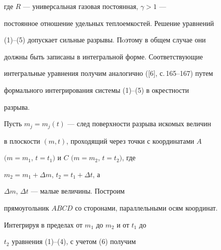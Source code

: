 где $R$ --- универсальная газовая постоянная, $ \gamma > 1 $ ---


постоянное отношение удельных теплоемкостей. Решение уравнений


(1)--(5) допускает сильные разрывы. Пoэтому в общем случае они


должны быть записаны в интегральной форме. Соответствующие


интегральные уравнения получим аналогично ([6], с.\,165--167) путем


формального интегрирования системы (1)--(5) в окрестности


разрыва.





Пусть $m_{j}=m_{j}(t)$ --- след поверхности разрыва искомых величин


в плоскости $(m,t)$, проходящий через точки с координатами $A$


$(m=m_{1}$, $t=t_{1})$ и $C$ $(m=m_{2}$, $t=t_{2})$, где


$m_{2}=m_{1} + {\Delta} m$, $t_{2}=t_{1} + {\Delta} t $, а


${\Delta} m $, ${\Delta} t$ --- малые величины. Построим


прямоугольник $ABCD$ со сторонами, параллельными осям координат.


Интегрируя в пределах от $m_{1}$ до $m_{2}$ и от $t_{1}$ до


$t_{2}$ уравнения (1)--(4), с учетом (6) получим


